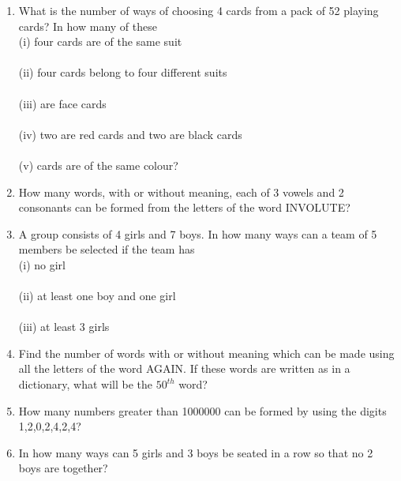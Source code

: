 \begin{enumerate}[label=\arabic*.,ref=\thesubsection.\theenumi]
\item What is the number of ways of choosing 4 cards from a pack of 52 playing cards? In how many of these\\
(i) four cards are of the same suit\\
\\(ii) four cards belong to four different suits\\
\\(iii) are face cards\\
\\(iv) two are red cards and two are black cards\\
\\(v) cards are of the same colour?\\

\item How many words, with or without meaning, each of 3 vowels and 2 consonants can be formed from the letters of the word INVOLUTE?\\

\item A group consists of 4 girls and 7 boys. In how many ways can a team of 5 members be selected if the team has\\
(i) no girl\\
\\(ii) at least one boy and one girl\\
\\(iii) at least 3 girls\\

\item Find the number of words with or without meaning which can be made using all the letters of the word AGAIN. If these words are written as in a dictionary, what will be the $50^{th}$ word?\\

\item How many numbers greater than 1000000 can be formed by using the digits 1,2,0,2,4,2,4?\\
\item In how many ways can 5 girls and 3 boys be seated in a row so that no 2 boys are together? 
\end{enumerate}
%
    
